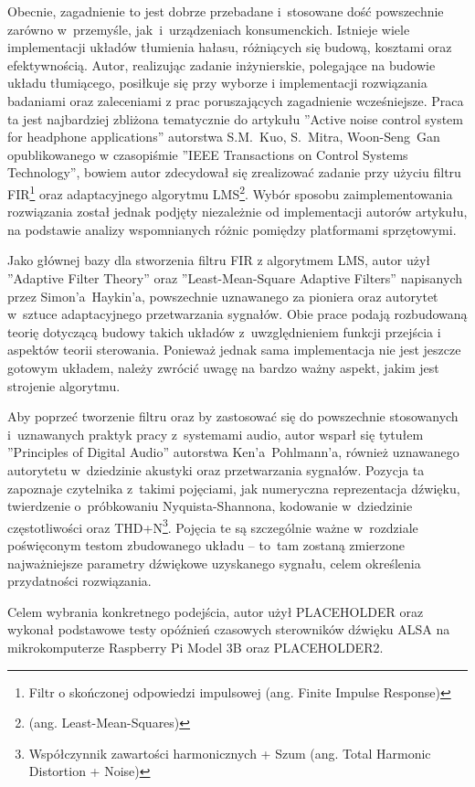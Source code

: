 Obecnie, zagadnienie to jest dobrze przebadane i~stosowane dość powszechnie zarówno w~przemyśle, jak~i~urządzeniach konsumenckich. Istnieje wiele implementacji układów tłumienia hałasu, różniących się budową, kosztami oraz efektywnością. Autor, realizując zadanie inżynierskie, polegające na budowie układu tłumiącego, posiłkuje się przy wyborze i implementacji rozwiązania badaniami oraz zaleceniami z prac poruszających zagadnienie wcześniejsze. Praca ta jest najbardziej zbliżona tematycznie do artykułu ''Active noise control system for headphone applications'' autorstwa S.M.~Kuo, S.~Mitra, Woon-Seng~Gan opublikowanego w czasopiśmie ''IEEE Transactions on Control Systems Technology'', bowiem autor zdecydował się zrealizować zadanie przy użyciu filtru FIR\footnote{Filtr o skończonej odpowiedzi impulsowej (ang. Finite Impulse Response)} oraz  adaptacyjnego algorytmu LMS\footnote{%
(ang. Least-Mean-Squares)}. Wybór sposobu zaimplementowania rozwiązania został jednak podjęty niezależnie od implementacji autorów artykułu, na podstawie analizy wspomnianych różnic pomiędzy platformami sprzętowymi.

Jako głównej bazy dla stworzenia filtru FIR z algorytmem LMS, autor użył ''Adaptive Filter Theory'' oraz ''Least-Mean-Square Adaptive Filters'' napisanych przez Simon'a~Haykin'a, powszechnie uznawanego za pioniera oraz autorytet w~sztuce adaptacyjnego przetwarzania sygnałów. Obie prace podają rozbudowaną teorię dotyczącą budowy takich układów z~uwzględnieniem funkcji przejścia i aspektów teorii sterowania. Ponieważ jednak sama implementacja nie jest jeszcze gotowym układem, należy zwrócić uwagę na bardzo ważny aspekt, jakim jest strojenie algorytmu.

Aby poprzeć tworzenie filtru oraz by zastosować się do powszechnie stosowanych i~uznawanych praktyk pracy z~systemami audio, autor wsparł się tytułem ''Principles of Digital Audio'' autorstwa Ken'a~Pohlmann'a, również uznawanego autorytetu w~dziedzinie akustyki oraz przetwarzania sygnałów. Pozycja ta zapoznaje czytelnika z~takimi pojęciami, jak numeryczna reprezentacja d\'zwięku, twierdzenie o~próbkowaniu Nyquista-Shannona, kodowanie w~dziedzinie częstotliwości oraz THD+N\footnote{Współczynnik zawartości harmonicznych + Szum	(ang. Total Harmonic Distortion + Noise)}. Pojęcia te są szczególnie ważne w~rozdziale poświęconym testom zbudowanego układu -- to~tam zostaną zmierzone najważniejsze parametry d\'zwiękowe uzyskanego sygnału, celem określenia przydatności rozwiązania.

Celem wybrania konkretnego podejścia, autor użył PLACEHOLDER %
oraz wykonał podstawowe testy opó\'znień czasowych sterowników d\'zwięku ALSA na mikrokomputerze Raspberry Pi Model 3B oraz PLACEHOLDER2.%

